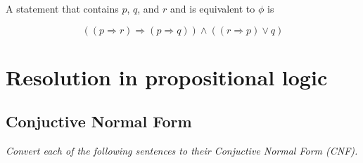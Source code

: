 A statement that contains $p$, $q$, and $r$ and is equivalent to $\phi$ is

$$ ((p \Longrightarrow r) \Longrightarrow (p \Longrightarrow q)) \land ((r \Longrightarrow p) \lor q) $$



\section{Resolution in propositional logic}

\subsection{Conjuctive Normal Form}
\textit{Convert each of the following sentences to their Conjuctive Normal Form (CNF).}

